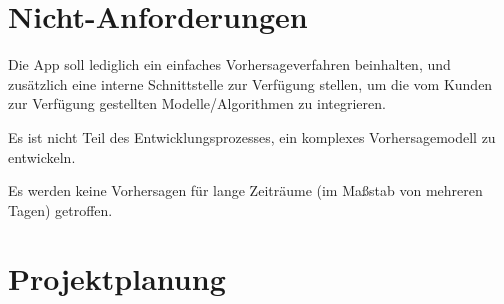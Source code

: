 \documentclass[12pt]{article} %
\begin{document}
 \section{Nicht-Anforderungen} \label{nicht-anforderungen}

Die App soll lediglich ein einfaches Vorhersageverfahren beinhalten, und zusätzlich eine interne Schnittstelle zur Verfügung stellen, um die vom Kunden zur Verfügung gestellten Modelle/Algorithmen zu integrieren.

Es ist nicht Teil des Entwicklungsprozesses, ein komplexes Vorhersagemodell zu entwickeln.

Es werden keine Vorhersagen für lange Zeiträume (im Maßstab von mehreren Tagen) getroffen.


\newpage

\section{Projektplanung} \label{planung}
\end{document}
